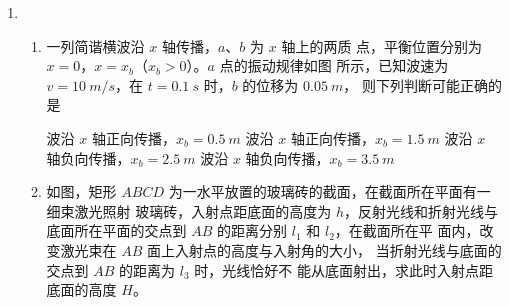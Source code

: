 \begin{enumerate}
\begin{enumerate}


	
\end{enumerate}


\item 
{}
\begin{enumerate}
	\item
一列简谐横波沿 $ x $ 轴传播，$ a $、$ b $ 为 $ x $ 轴上的两质
点，平衡位置分别为 $ x=0 $，$ x= x_{b} $（$ x_{b} >0 $）。$ a $ 点的振动规律如图
所示，已知波速为 $ v=10 \ m /s $，在 $ t=0.1 \ s $ 时，$ b $ 的位移为 $ 0.05 \ m $，
则下列判断可能正确的是  

\fourchoices
{波沿 $ x $ 轴正向传播，$ x_{b} =0.5 \ m $}
{波沿 $ x $ 轴正向传播，$ x_{b} =1.5 \ m $}
{波沿 $ x $ 轴负向传播，$ x_{b} =2.5 \ m $}
{波沿 $ x $ 轴负向传播，$ x_{b} =3.5 \ m $}


\item 
如图，矩形 $ ABCD $ 为一水平放置的玻璃砖的截面，在截面所在平面有一细束激光照射
玻璃砖，入射点距底面的高度为 $ h $，反射光线和折射光线与
底面所在平面的交点到 $ AB $ 的距离分别 $ l_{1} $ 和 $ l_{2} $，在截面所在平
面内，改变激光束在 $ AB $ 面上入射点的高度与入射角的大小，
当折射光线与底面的交点到 $ AB $ 的距离为 $ l_{3} $ 时，光线恰好不
能从底面射出，求此时入射点距底面的高度 $ H $。
\begin{figure}[h!]
	\flushright
	
\end{figure}




\end{enumerate}



\end{enumerate}
